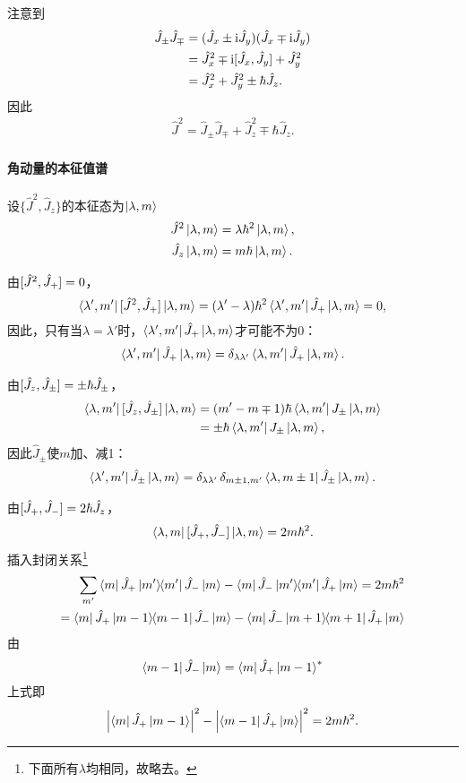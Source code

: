 注意到
\begin{align*}
	\hat J_\pm\hat J_\mp&=(\hat J_x\pm\i\hat J_y)(\hat J_x\mp\i\hat J_y)\\
	&=\hat J_x^2\mp\i\cmm{J_x}{J_y}+\hat J_y^2\\
	&=\hat J_x^2+\hat J_y^2\pm\hbar\hat J_z.
\end{align*}
因此 
\begin{align}
	\hat J^2=\hat J_\pm\hat J_\mp+\hat J_z^2\mp\hbar\hat J_z.
\end{align}
\paragraph{角动量的本征值谱}设$\{\hat J^2,\hat J_z\}$的本征态为$\ket{\lambda,m}$
\begin{align*}
	\hat J^2\ket{\lambda,m}&=\lambda\hbar^2\ket{\lambda,m},\\
	\hat J_z\ket{\lambda,m}&=m\hbar\ket{\lambda,m}.
\end{align*}

由$\cmm{J^2}{J_+}=0$，
\[
	\bra{\lambda',m'}\cmm{J^2}{J_+}\ket{\lambda,m}=(\lambda'-\lambda)\hbar^2\bra{\lambda',m'}\hat J_+\ket{\lambda,m}=0,
\]
因此，只有当$\lambda=\lambda'$时，$\bra{\lambda',m'}\hat J_+\ket{\lambda,m}$才可能不为0：
\begin{align}
	\bra{\lambda',m'}\hat J_+\ket{\lambda,m}=\vd_{\lambda\lambda'}\bra{\lambda,m'}\hat J_+\ket{\lambda,m}.
\end{align}

由$\cmm{J_z}{J_\pm}=\pm\hbar\hat J_\pm$，
\begin{align*}
	\bra{\lambda,m'}\cmm{J_z}{J_\pm}\ket{\lambda,m}&=(m'-m\mp 1)\hbar\bra{\lambda,m'}J_\pm\ket{\lambda,m}\\
	&=\pm\hbar\bra{\lambda,m'}J_\pm\ket{\lambda,m},
\end{align*}
因此$\hat J_\pm$使$m$加、减1：
\begin{align}
	\bra{\lambda',m'}\hat J_\pm\ket{\lambda,m}=\vd_{\lambda\lambda'}\vd_{m\pm 1,m'}\bra{\lambda,m\pm 1}\hat J_\pm\ket{\lambda,m}.
\end{align}

由$\cmm{J_+}{J_-}=2\hbar\hat J_z$，
\[
	\bra{\lambda,m}\cmm{J_+}{J_-}\ket{\lambda,m}=2m\hbar^2.
\]%
插入封闭关系\footnote{下面所有$\lambda$均相同，故略去。}
\begin{align*}
	\sum_{m'}\bra{m}\hat J_+\ktbr{m'}{m'}\hat J_-\ket{m}-\bra{m}\hat J_-\ktbr{m'}{m'}\hat J_+\ket{m}=2m\hbar^2\\
	=\bra{m}\hat J_+\ktbr{m-1}{m-1}\hat J_-\ket{m}-\bra{m}\hat J_-\ktbr{m+1}{m+1}\hat J_+\ket{m}
\end{align*}
由
\[
	\bra{m-1}\hat J_-\ket{m}=\bra{m}\hat J_+\ket{m-1}\cj
\]
上式即
\begin{align}
	\abs{\bra{m}\hat J_+\ket{m-1}}^2-\abs{\bra{m-1}\hat J_+\ket{m}}^2=2m\hbar^2.
\end{align}

